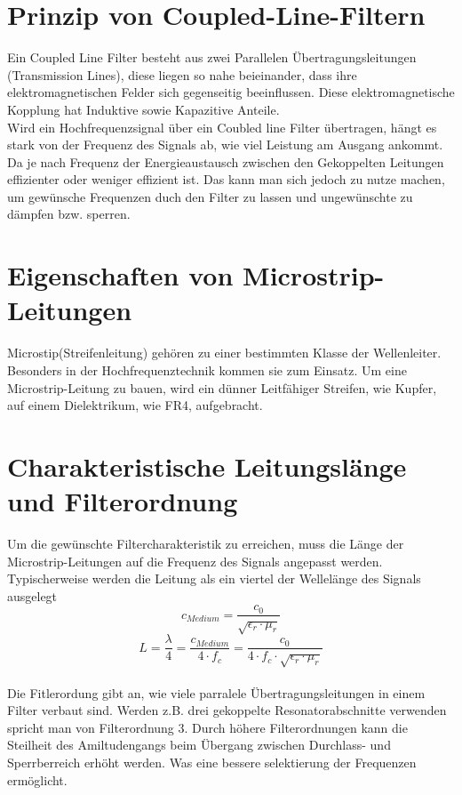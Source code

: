 \section{Prinzip von Coupled-Line-Filtern}
Ein Coupled Line Filter besteht aus zwei Parallelen Übertragungsleitungen (Transmission Lines), 
diese liegen so nahe beieinander, dass ihre elektromagnetischen Felder sich gegenseitig beeinflussen.
Diese elektromagnetische Kopplung hat Induktive sowie Kapazitive Anteile.
\\
Wird ein Hochfrequenzsignal über ein Coubled line Filter übertragen, hängt es stark
von der Frequenz des Signals ab, wie viel Leistung am Ausgang ankommt.
Da je nach Frequenz der Energieaustausch zwischen den Gekoppelten Leitungen effizienter oder weniger effizient ist.
Das kann man sich jedoch zu nutze machen, um gewünsche Frequenzen duch den Filter zu lassen und ungewünschte zu dämpfen bzw. sperren.

\section{Eigenschaften von Microstrip-Leitungen}
Microstip(Streifenleitung) gehören zu einer bestimmten Klasse der Wellenleiter.
Besonders in der Hochfrequenztechnik kommen sie zum Einsatz.
Um eine Microstrip-Leitung zu bauen, wird ein dünner Leitfähiger Streifen, wie Kupfer, auf einem Dielektrikum, wie FR4, aufgebracht.
\newpage
\section{Charakteristische Leitungslänge und Filterordnung}
Um die gewünschte Filtercharakteristik zu erreichen,
muss die Länge der Microstrip-Leitungen auf die Frequenz des Signals angepasst werden.
Typischerweise werden die Leitung als ein viertel der Wellelänge des Signals ausgelegt
\begin{equation}
    c_{Medium} = \frac{c_0}{\sqrt{\epsilon_r \cdot \mu_r}}
\end{equation}
\begin{equation}
    L= \frac{\lambda}{4} = \frac{c_{Medium}}{4 \cdot f_c}=\frac{c_0}{4 \cdot f_c \cdot \sqrt{\epsilon_r \cdot \mu_r}}
    \label{eq:laenge}
\end{equation}
\\
Die Fitlerordung gibt an, wie viele parralele Übertragungsleitungen in einem Filter verbaut sind.
Werden z.B. drei gekoppelte Resonatorabschnitte verwenden spricht man von Filterordnung 3.
Durch höhere Filterordnungen kann die Steilheit des Amiltudengangs beim Übergang zwischen Durchlass- und Sperrberreich erhöht werden.
Was eine bessere selektierung der Frequenzen ermöglicht.


